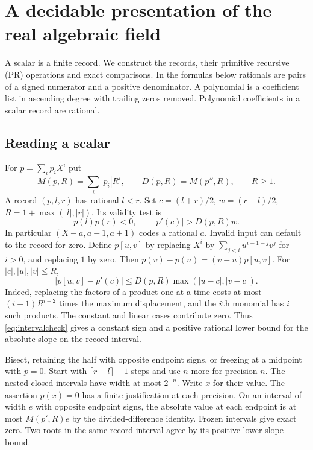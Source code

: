 \section{A decidable presentation of the real algebraic field}
\label{sec:scalar}
A scalar is a finite record. We construct the records, their primitive
recursive (PR) operations and exact comparisons. In the formulas below
rationals are pairs of a signed numerator and a positive denominator.
A polynomial is a coefficient list in ascending degree with trailing
zeros removed. Polynomial coefficients in a scalar record are rational.

\subsection{Reading a scalar}
For $p=\sum_i p_iX^i$ put
\[
 M(p,R)=\sum_i |p_i|R^i,\qquad D(p,R)=M(p'',R),\qquad R\ge1.
\]
A record $(p,l,r)$ has rational $l<r$. Set
$c=(l+r)/2$, $w=(r-l)/2$, $R=1+\max(|l|,|r|)$. Its validity test is
\begin{equation}
 p(l)p(r)<0,\qquad |p'(c)|>D(p,R)w. \label{eq:intervalcheck}
\end{equation}
In particular $(X-a,a-1,a+1)$ codes a rational $a$. Invalid input
can default to the record for zero. Define $p[u,v]$ by replacing
$X^i$ by $\sum_{j<i}u^{i-1-j}v^j$ for $i>0$, and replacing $1$ by zero.
Then $p(v)-p(u)=(v-u)p[u,v]$. For $|c|,|u|,|v|\le R$,
\begin{equation}
 |p[u,v]-p'(c)|\le D(p,R)\max(|u-c|,|v-c|).
 \label{eq:divdiff}
\end{equation}
Indeed, replacing the factors of a product one at a time costs at most
$(i-1)R^{i-2}$ times the maximum displacement, and the $i$th monomial
has $i$ such products. The constant and linear cases contribute zero.
Thus \eqref{eq:intervalcheck} gives a constant sign and a positive
rational lower bound for the absolute slope on the record interval.

Bisect, retaining the half with opposite endpoint signs, or freezing
at a midpoint with $p=0$. Start with $\lceil r-l\rceil+1$ steps and
use $n$ more for precision $n$. The nested closed intervals have width
at most $2^{-n}$. Write $x$ for their value. The assertion $p(x)=0$
has a finite justification at each precision. On an interval of width
$e$ with opposite endpoint signs, the absolute value at each endpoint is
at most $M(p',R)e$ by the divided-difference identity. Frozen intervals
give exact zero. Two roots in the same record interval agree by its
positive lower slope bound.

